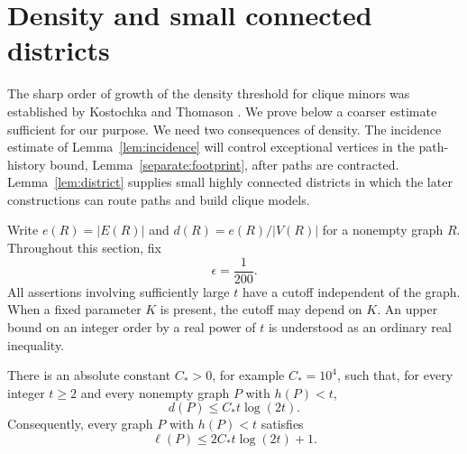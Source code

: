 \section{Density and small connected districts}
\label{sec:density}

The sharp order of growth of the density threshold for clique minors
was established by Kostochka \cite{Kostochka1982,Kostochka1984} and
Thomason \cite{Thomason1984}. We prove below a coarser estimate sufficient for
our purpose. We need two consequences of density. The incidence estimate of
Lemma~\ref{lem:incidence} will control exceptional vertices in the
path-history bound, Lemma~\ref{separate:footprint}, after paths are
contracted. Lemma~\ref{lem:district} supplies small highly connected
districts in which the later constructions can route paths and build
clique models.

Write \(e(R)=|E(R)|\) and \(d(R)=e(R)/|V(R)|\) for a nonempty graph \(R\).
Throughout this section, fix
\[
 \epsilon=\frac1{200}.
\]
All assertions involving sufficiently large \(t\) have a cutoff independent of
the graph. When a fixed parameter \(K\) is present, the cutoff may depend on
\(K\). An upper bound on an integer order by a real power of \(t\) is understood
as an ordinary real inequality.

\begin{lemma}\label{lem:coarse-density}
There is an absolute constant \(C_*>0\), for example \(C_*=10^4\),
such that, for every integer \(t\ge2\)
and every nonempty graph \(P\) with \(h(P)<t\),
\[
 d(P)\le C_*t\log(2t).
\]
Consequently, every graph \(P\) with \(h(P)<t\) satisfies
\[
 \ell(P)\le 2C_*t\log(2t)+1.
\]
\end{lemma}

